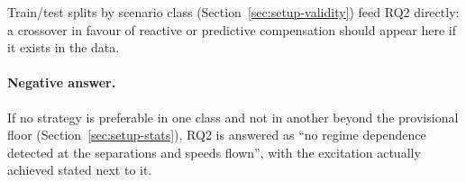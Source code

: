 Train/test splits by scenario class (Section~\ref{sec:setup-validity}) feed RQ2 directly: a crossover
in favour of reactive or predictive compensation should appear here if it exists in the data.
\paragraph{Negative answer.} If no strategy is preferable in one class and not in another beyond the
provisional floor (Section~\ref{sec:setup-stats}), RQ2 is answered as ``no regime dependence detected at the separations and
speeds flown'', with the excitation actually achieved stated next to it.
